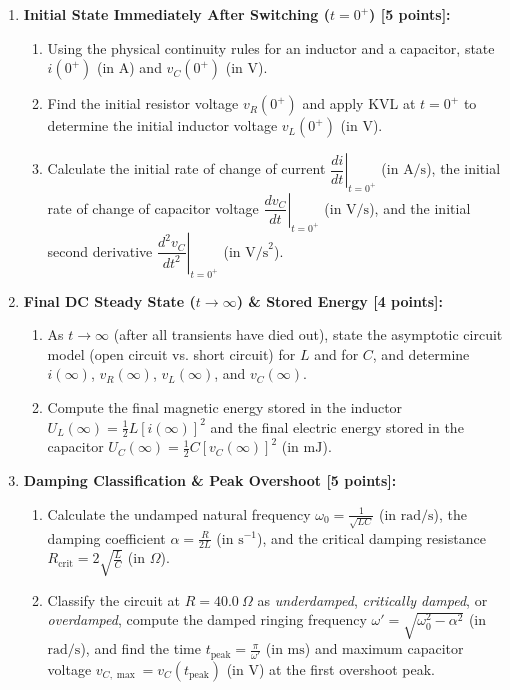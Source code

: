 \documentclass[10pt,letterpaper]{article}
\begin{document}
\begin{enumerate}
  \item \textbf{Initial State Immediately After Switching ($t = 0^+$) [5 points]:}
    \begin{enumerate}
      \item Using the physical continuity rules for an inductor and a capacitor, state $i(0^+)$ (in $\text{A}$) and $v_C(0^+)$ (in $\text{V}$).
      \item Find the initial resistor voltage $v_R(0^+)$ and apply KVL at $t = 0^+$ to determine the initial inductor voltage $v_L(0^+)$ (in $\text{V}$).
      \item Calculate the initial rate of change of current $\left.\dfrac{di}{dt}\right|_{t=0^+}$ (in $\text{A/s}$), the initial rate of change of capacitor voltage $\left.\dfrac{dv_C}{dt}\right|_{t=0^+}$ (in $\text{V/s}$), and the initial second derivative $\left.\dfrac{d^2 v_C}{dt^2}\right|_{t=0^+}$ (in $\text{V/s}^2$).
    \end{enumerate}
  
  \item \textbf{Final DC Steady State ($t \to \infty$) \& Stored Energy [4 points]:}
    \begin{enumerate}
      \item As $t \to \infty$ (after all transients have died out), state the asymptotic circuit model (open circuit vs. short circuit) for $L$ and for $C$, and determine $i(\infty)$, $v_R(\infty)$, $v_L(\infty)$, and $v_C(\infty)$.
      \item Compute the final magnetic energy stored in the inductor $U_L(\infty) = \frac{1}{2}L[i(\infty)]^2$ and the final electric energy stored in the capacitor $U_C(\infty) = \frac{1}{2}C[v_C(\infty)]^2$ (in $\text{mJ}$).
    \end{enumerate}
  
  \item \textbf{Damping Classification \& Peak Overshoot [5 points]:}
    \begin{enumerate}
      \item Calculate the undamped natural frequency $\omega_0 = \frac{1}{\sqrt{LC}}$ (in $\text{rad/s}$), the damping coefficient $\alpha = \frac{R}{2L}$ (in $\text{s}^{-1}$), and the critical damping resistance $R_{\text{crit}} = 2\sqrt{\frac{L}{C}}$ (in $\Omega$).
      \item Classify the circuit at $R = 40.0\ \Omega$ as \emph{underdamped}, \emph{critically damped}, or \emph{overdamped}, compute the damped ringing frequency $\omega' = \sqrt{\omega_0^2 - \alpha^2}$ (in $\text{rad/s}$), and find the time $t_{\text{peak}} = \frac{\pi}{\omega'}$ (in $\text{ms}$) and maximum capacitor voltage $v_{C,\max} = v_C(t_{\text{peak}})$ (in $\text{V}$) at the first overshoot peak.
    \end{enumerate}
  
\end{enumerate}
\vspace{1.2in}
\end{document}

